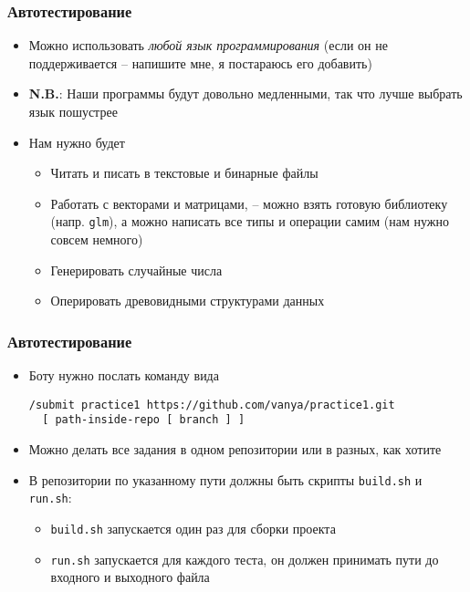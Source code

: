 \documentclass[10pt,handout]{beamer}
\begin{document}
\begin{frame}[fragile]
\frametitle{Автотестирование}
\begin{itemize}
\item Можно использовать \textit{любой язык программирования} (если он не поддерживается -- напишите мне, я постараюсь его добавить)
\pause
\item \alert{\textbf{N.B.}}: Наши программы будут довольно медленными, так что лучше выбрать язык пошустрее
\pause
\item Нам нужно будет
\begin{itemize}
\item Читать и писать в текстовые и бинарные файлы
\pause
\item Работать с векторами и матрицами, -- можно взять готовую библиотеку (напр. \texttt{glm}), а можно написать все типы и операции самим (нам нужно совсем немного)
\pause
\item Генерировать случайные числа
\pause
\item Оперировать древовидными структурами данных
\end{itemize}
\end{itemize}
\end{frame}

\begin{frame}[fragile]
\frametitle{Автотестирование}
\begin{itemize}
\item Боту нужно послать команду вида
\begin{verbatim}
/submit practice1 https://github.com/vanya/practice1.git
  [ path-inside-repo [ branch ] ]
\end{verbatim}
\pause
\item Можно делать все задания в одном репозитории или в разных, как хотите
\pause
\item В репозитории по указанному пути должны быть скрипты \texttt{build.sh} и \texttt{run.sh}:
\begin{itemize}
\item \texttt{build.sh} запускается один раз для сборки проекта
\item \texttt{run.sh} запускается для каждого теста, он должен принимать пути до входного и выходного файла
\end{itemize}
\end{itemize}
\end{frame}
\end{document}
